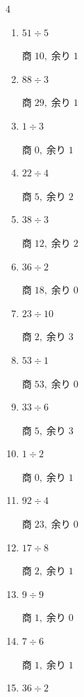 \begin{multicols}{4}
\begin{enumerate}
  \item $51 \div 5$

        $商\; 10,\; 余り\; 1$

  \item $88 \div 3$

        $商\; 29,\; 余り\; 1$

  \item $1 \div 3$

        $商\; 0,\; 余り\; 1$

  \item $22 \div 4$

        $商\; 5,\; 余り\; 2$

  \item $38 \div 3$

        $商\; 12,\; 余り\; 2$

  \item $36 \div 2$

        $商\; 18,\; 余り\; 0$

  \item $23 \div 10$

        $商\; 2,\; 余り\; 3$

  \item $53 \div 1$

        $商\; 53,\; 余り\; 0$

  \item $33 \div 6$

        $商\; 5,\; 余り\; 3$

\columnbreak %

\resetques

  \item $1 \div 2$

        $商\; 0,\; 余り\; 1$

  \item $92 \div 4$

        $商\; 23,\; 余り\; 0$

  \item $17 \div 8$

        $商\; 2,\; 余り\; 1$

  \item $9 \div 9$

        $商\; 1,\; 余り\; 0$

  \item $7 \div 6$

        $商\; 1,\; 余り\; 1$

  \item $36 \div 2$


\end{enumerate}
\end{multicols}
